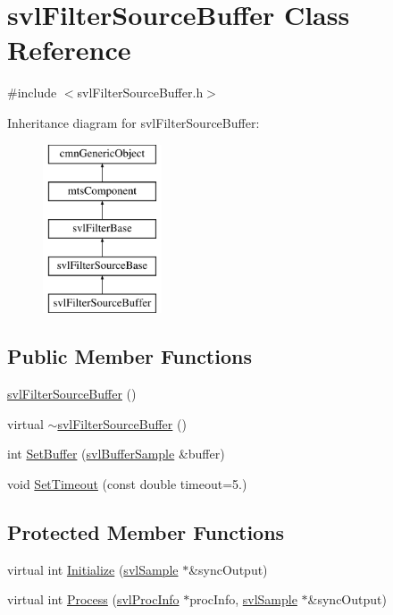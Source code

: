 \hypertarget{classsvl_filter_source_buffer}{\section{svl\-Filter\-Source\-Buffer Class Reference}
\label{classsvl_filter_source_buffer}
}


{\ttfamily \#include $<$svl\-Filter\-Source\-Buffer.\-h$>$}

Inheritance diagram for svl\-Filter\-Source\-Buffer\-:\begin{figure}[H]
\begin{center}
\leavevmode
\includegraphics[height=5.000000cm]{dc/d20/classsvl_filter_source_buffer}
\end{center}
\end{figure}
\subsection*{Public Member Functions}
\begin{DoxyCompactItemize}
\item 
\hyperlink{classsvl_filter_source_buffer_a6cd7955d0b549b7cd6b0851f5cad3c25}{svl\-Filter\-Source\-Buffer} ()
\item 
virtual \hyperlink{classsvl_filter_source_buffer_ab697409a667729e549ec37e669c04d78}{$\sim$svl\-Filter\-Source\-Buffer} ()
\item 
int \hyperlink{classsvl_filter_source_buffer_a1aa99d859b80c0d1d141e2966c7c5a3e}{Set\-Buffer} (\hyperlink{classsvl_buffer_sample}{svl\-Buffer\-Sample} \&buffer)
\item 
void \hyperlink{classsvl_filter_source_buffer_af34e57ac8e5d500c62c75fe8bca206a5}{Set\-Timeout} (const double timeout=5.)
\end{DoxyCompactItemize}
\subsection*{Protected Member Functions}
\begin{DoxyCompactItemize}
\item 
virtual int \hyperlink{classsvl_filter_source_buffer_a671424826b177c6e4f343a453463a4cb}{Initialize} (\hyperlink{classsvl_sample}{svl\-Sample} $\ast$\&sync\-Output)
\item 
virtual int \hyperlink{classsvl_filter_source_buffer_acf23afc3f5fc22cb8da65664766d6bf0}{Process} (\hyperlink{structsvl_proc_info}{svl\-Proc\-Info} $\ast$proc\-Info, \hyperlink{classsvl_sample}{svl\-Sample} $\ast$\&sync\-Output)
\end{DoxyCompactItemize}
